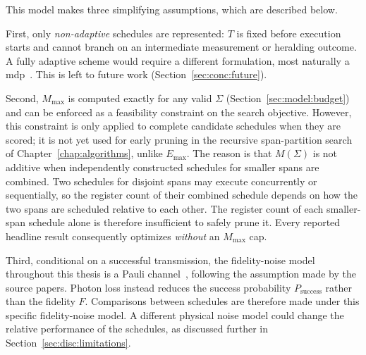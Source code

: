 
This model makes three simplifying assumptions, which are described below.

\vspace{0.5cm}

First, only \emph{non-adaptive} schedules are represented: $T$ is fixed before execution starts and cannot branch on an intermediate measurement or heralding outcome. A fully adaptive scheme would require a different formulation, most naturally a \Gls{mdp}~\cite{Puterman2009Markov,Sutton2014Reinforcement}. This is left to future work (Section~\ref{sec:conc:future}).

\vspace{0.5cm}

Second, $M_{\max}$ is computed exactly for any valid $\Sigma$ (Section~\ref{sec:model:budget}) and can be enforced as a feasibility constraint on the search objective. However, this constraint is only applied to complete candidate schedules when they are scored; it is not yet used for early pruning in the recursive span-partition search of Chapter~\ref{chap:algorithms}, unlike $E_{\max}$. The reason is that $M(\Sigma)$ is not additive when independently constructed schedules for smaller spans are combined. Two schedules for disjoint spans may execute concurrently or sequentially, so the register count of their combined schedule depends on how the two spans are scheduled relative to each other. The register count of each smaller-span schedule alone is therefore insufficient to safely prune it. Every reported headline result consequently optimizes \emph{without} an $M_{\max}$ cap.

\vspace{0.5cm}

Third, conditional on a successful transmission, the fidelity-noise model throughout this thesis is a Pauli channel~\cite{Nielsen2010Quantum,Jamiolkowski1972Linear,Choi1975Completely}, following the assumption made by the source papers. Photon loss instead reduces the success probability $P_{\mathrm{success}}$ rather than the fidelity $F$. Comparisons between schedules are therefore made under this specific fidelity-noise model. A different physical noise model could change the relative performance of the schedules, as discussed further in Section~\ref{sec:disc:limitations}.